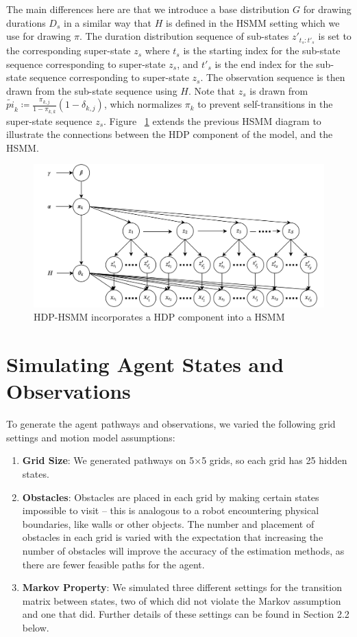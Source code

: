 \documentclass{article}
\begin{document}
The main differences here are that we introduce a base distribution $G$ for drawing durations $D_s$ in a similar way that $H$ is defined in the HSMM setting which we use for drawing $\pi$. The duration distribution sequence of sub-states $z'_{t_{s}:t'_{s}}$ is set to the corresponding super-state $z_{s}$ where $t_{s}$ is the starting index for the sub-state sequence corresponding to super-state $z_s$, and $t'_{s}$ is the end index for the sub-state sequence corresponding to super-state $z_s$. The observation sequence is then drawn from the sub-state sequence using $H$. Note that $z_s$ is drawn from $\tilde{pi}_{k} \coloneqq \frac{\pi_{k,j}}{1-\pi_{k,k}}(1 - \delta_{k,j})$, which normalizes $\pi_k$ to prevent self-transitions in the super-state sequence $z_s$. Figure ~\ref{fig:hdphsmm} extends the previous HSMM diagram to illustrate the connections between the HDP component of the model, and the HSMM.

\begin{figure}[H]
\centering
\includegraphics[scale=0.12]{images/hdphsmm.png}
\caption{HDP-HSMM incorporates a HDP component into a HSMM}
\label{fig:hdphsmm}
\end{figure}

\section{Simulating Agent States and Observations}

To generate the agent pathways and observations, we varied the following grid settings and motion model assumptions:

\begin{enumerate}
	\item \textbf{Grid Size}: We generated pathways on 5$\times$5 grids, so each grid has 25 hidden states.
	\item \textbf{Obstacles}: Obstacles are placed in each grid by making certain states impossible to visit -- this is analogous to a robot encountering physical boundaries, like walls or other objects. The number and placement of obstacles in each grid is varied with the expectation that increasing the number of obstacles will improve the accuracy of the estimation methods, as there are fewer feasible paths for the agent.
	\item \textbf{Markov Property}: We simulated three different settings for the transition matrix between states, two of which did not violate the Markov assumption and one that did. Further details of these settings can be found in Section 2.2 below.
\end{enumerate}
\end{document}
